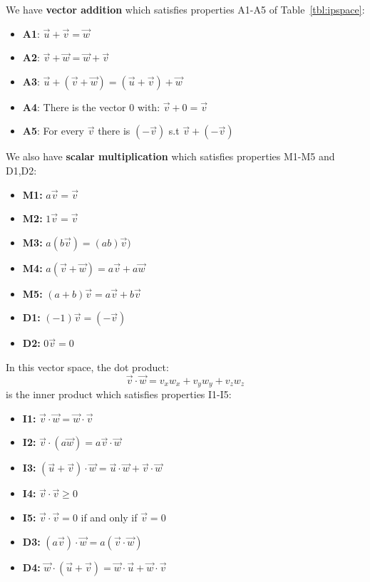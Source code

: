 \documentclass[12pt]{book}
\begin{document}
\begin{samepage}
We have {\bf vector addition} which satisfies properties A1-A5 of Table~\ref{tbl:ipspace}:
\begin{itemize}
\item {\bf A1}: $\vec{u} + \vec{v} = \vec{w}$ 
\item {\bf A2}: $\vec{v} + \vec{w} = \vec{w} + \vec{v}$
\item {\bf A3}: $\vec{u} + (\vec{v} + \vec{w}) = (\vec{u} + \vec{v}) + \vec{w} $
\item {\bf A4}: There is the vector 0 with: $\vec{v} + 0 = \vec{v} $
\item {\bf A5}: For every $\vec{v}$ there is $(-\vec{v})$ s.t $\vec{v} + (-\vec{v})$
\end{itemize}
\end{samepage}

\begin{samepage}
\noindent
We also have {\bf scalar multiplication} which satisfies properties M1-M5 and D1,D2:
\begin{itemize}
\item {\bf M1:} $a \vec{v} = \vec{v}$
\item {\bf M2:} $1 \vec{v} = \vec{v}$
\item {\bf M3:} $a(b\vec{v}) = (ab)\vec{v})$
\item {\bf M4:} $a(\vec{v} + \vec{w}) = a\vec{v} + a\vec{w}$
\item {\bf M5:} $(a+b)\vec{v} = a\vec{v} + b\vec{v}$
\item {\bf D1:} $(-1)\vec{v} = (-\vec{v})$
\item {\bf D2:} $0\vec{v} = 0$
\end{itemize}
\end{samepage}

\noindent
In this vector space, the dot product:
\begin{displaymath}
\vec{v} \cdot \vec{w} = v_x w_x + v_y w_y + v_z w_z 
\end{displaymath}
is the inner product which satisfies properties I1-I5:
\begin{itemize}
\item {\bf I1:} $\vec{v} \cdot \vec{w} = \vec{w} \cdot \vec{v}$
\item {\bf I2:} $\vec{v} \cdot \left(a\vec{w}\right) = a \vec{v} \cdot \vec{w}$
\item {\bf I3:} $\left(\vec{u} + \vec{v}\right) \cdot \vec{w} = \vec{u} \cdot \vec{w} + \vec{v} \cdot \vec{w} $
\item {\bf I4:} $\vec{v} \cdot \vec{v} \geq 0$
\item {\bf I5:} $\vec{v} \cdot \vec{v} = 0$ if and only if $\vec{v} = 0$
\item {\bf D3:} $\left(a\vec{v}\right) \cdot \vec{w} = a \left( \vec{v} \cdot \vec{w}\right) $
\item {\bf D4:} $\vec{w} \cdot \left(\vec{u} + \vec{v}\right)  = \vec{w} \cdot \vec{u} + \vec{w} \cdot \vec{v}$
\end{itemize}
\end{document}
